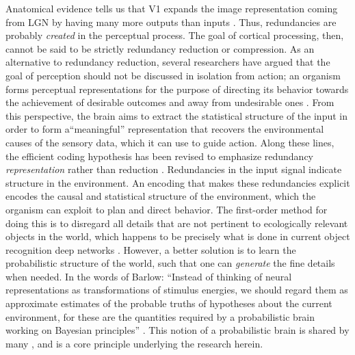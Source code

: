 Anatomical evidence tells us that V1 expands the image representation coming from LGN by having many more outputs than inputs \parencite{olshausen2003principles}. Thus, redundancies are probably \textit{created} in the perceptual process. The goal of cortical processing, then, cannot be said to be strictly redundancy reduction or compression. As an alternative to redundancy reduction, several researchers have argued that the goal of perception should not be discussed in isolation from action; an organism forms perceptual representations for the purpose of directing its behavior towards the achievement of desirable outcomes and away from undesirable ones \parencite{barlow2001redundancy, simoncelli2001natural}. From this perspective, the brain aims to extract the statistical structure of the input in order to form a``meaningful'' representation that recovers the environmental causes of the sensory data, which it can use to guide action. Along these lines, the efficient coding hypothesis has been revised to emphasize redundancy \textit{representation} rather than reduction \parencite{barlow2001redundancy}. Redundancies in the input signal indicate structure in the environment. An encoding that makes these redundancies explicit encodes the causal and statistical structure of the environment, which the organism can exploit to plan and direct behavior. The first-order method for doing this is to disregard all details that are not pertinent to ecologically relevant objects in the world, which happens to be precisely what is done in current object recognition deep networks \parencite{tishby2015deep}. However, a better solution is to learn the probabilistic structure of the world, such that one can \textit{generate} the fine details when needed. In the words of Barlow: ``Instead of thinking of neural representations as transformations of stimulus energies, we should regard them as approximate estimates of the probable truths of hypotheses about the current environment, for these are the quantities required by a probabilistic brain working on Bayesian principles'' \parencite{barlow2001redundancy}. This notion of a probabilistic brain is shared by many \parencite{kersten2004object, lee2003hierarchical, lewicki1997bayesian, olshausen2013perception}, and is a core principle underlying the research herein.

